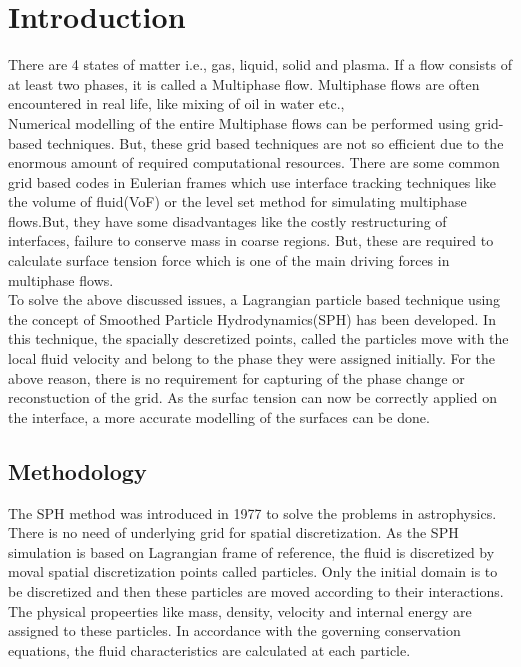 
\newcommand{\etas}{\ensuremath{\eta_{\mathrm{s}}}}


\chapter{Introduction}

There are 4 states of matter i.e., gas, liquid, solid and plasma. If a flow consists of at least two phases, it is called a 
Multiphase flow. Multiphase flows are often encountered in real life, like mixing of oil in water etc., \\

Numerical modelling of the entire Multiphase flows can be performed using grid-based techniques. But, these grid based techniques
are not so efficient due to the enormous amount of required computational resources. There are some common grid based codes in 
Eulerian frames which use interface tracking techniques like the volume of fluid(VoF) or the level set method for simulating multiphase
flows.But, they have some disadvantages like the costly restructuring of interfaces, failure to conserve mass in coarse regions.
But, these are required to calculate surface tension force which is one of the main driving forces in multiphase flows.\\

To solve the above discussed issues, a Lagrangian particle based technique using the concept of Smoothed Particle Hydrodynamics(SPH)
has been developed. In this technique, the spacially descretized points, called the particles move with the local fluid velocity
and belong to the phase they were assigned initially. For the above reason, there is no requirement for capturing of the phase change or reconstuction
of the grid. As the surfac tension can now be correctly applied on the interface, a more accurate modelling of the surfaces can
be done. \\

\section{Methodology}

The SPH method was introduced in 1977 to solve the problems in astrophysics. There is no need of underlying grid for spatial discretization. As the SPH simulation is based on Lagrangian frame of reference, the fluid is discretized by moval spatial discretization points called particles. Only the initial domain is to be discretized and then these particles are moved according to their interactions. The physical propeerties like mass, density, velocity and internal energy are assigned to these particles. In accordance with the governing conservation equations, the fluid characteristics are calculated at each particle.


